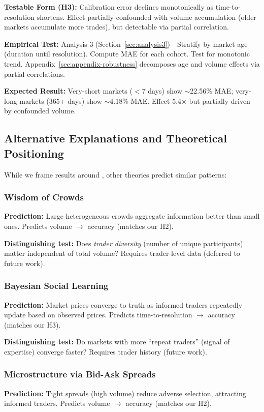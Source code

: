 \documentclass[12pt,letterpaper]{article}
\begin{document}
\textbf{Testable Form (H3):} Calibration error declines monotonically as time-to-resolution shortens. Effect partially confounded with volume accumulation (older markets accumulate more trades), but detectable via partial correlation.

\textbf{Empirical Test:} Analysis 3 (Section~\ref{sec:analysis3})---Stratify by market age (duration until resolution). Compute MAE for each cohort. Test for monotonic trend. Appendix~\ref{sec:appendix-robustness} decomposes age and volume effects via partial correlations.

\textbf{Expected Result:} Very-short markets ($<$7 days) show $\sim$22.56\% MAE; very-long markets (365+ days) show $\sim$4.18\% MAE. Effect 5.4$\times$ but partially driven by confounded volume.

\subsection{Alternative Explanations and Theoretical Positioning}

While we frame results around \citet{ottaviani2007outcomes}, other theories predict similar patterns:

\subsubsection{Wisdom of Crowds \citep{surowiecki2004wisdom}}
\textbf{Prediction:} Large heterogeneous crowds aggregate information better than small ones. Predicts volume $\rightarrow$ accuracy (matches our H2).

\textbf{Distinguishing test:} Does \textit{trader diversity} (number of unique participants) matter independent of total volume? Requires trader-level data (deferred to future work).

\subsubsection{Bayesian Social Learning \citep{degroot1974reaching}}
\textbf{Prediction:} Market prices converge to truth as informed traders repeatedly update based on observed prices. Predicts time-to-resolution $\rightarrow$ accuracy (matches our H3).

\textbf{Distinguishing test:} Do markets with more ``repeat traders'' (signal of expertise) converge faster? Requires trader history (future work).

\subsubsection{Microstructure via Bid-Ask Spreads \citep{glosten1985bid}}
\textbf{Prediction:} Tight spreads (high volume) reduce adverse selection, attracting informed traders. Predicts volume $\rightarrow$ accuracy (matches our H2).
\end{document}
